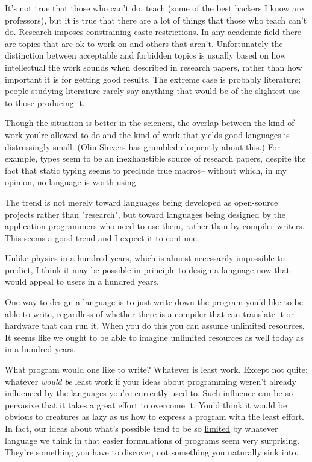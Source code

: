 It's not true that those who can't do, teach (some of the best
hackers I know are professors), but it is true that there are a
lot of things that those who teach can't do.  \href{http://www.paulgraham.com/desres.html}{Research} imposes
constraining caste restrictions.  In any academic
field there are topics that are ok to work on and others that
aren't.  Unfortunately the distinction between acceptable and
forbidden topics is usually based on how intellectual
the work sounds when described in research papers, rather than
how important it is for getting good results.  The extreme case
is probably literature; people studying literature rarely  
say anything that would be of the slightest use to those
producing it.

Though the situation is better in the sciences,
the overlap between the kind of work you're allowed to do and the
kind of work that yields good languages is distressingly small.
(Olin Shivers has grumbled eloquently
about this.)  For example, types seem to be an inexhaustible source
of research papers, despite the fact that static typing
seems to preclude true macros-- without which, in my opinion, no
language is worth using.

The trend is not merely toward languages being developed
as open-source projects rather than "research", but toward
languages being designed by the application programmers who need
to use them, rather than by compiler writers.  This seems a good
trend and I expect it to continue.




Unlike physics in a hundred years, which is almost necessarily
impossible to predict, I think it may be possible in principle
to design a language now that would appeal to users in a hundred
years.

One way to design a language is to just write down the program
you'd like to be able to write, regardless of whether there 
is a compiler that can translate it or hardware that can run it.
When you do this you can assume unlimited resources.  It seems
like we ought to be able to imagine unlimited resources as well
today as in a hundred years.

What program would one like to write?  Whatever is least work.
Except not quite: whatever \emph{would be} least work if your ideas about
programming weren't already influenced by the languages you're 
currently used to.  Such influence can be so pervasive that   
it takes a great effort to overcome it.  You'd think it would
be obvious to creatures as lazy as us how to express a program
with the least effort.  In fact, our ideas about what's possible
tend to be so \href{http://www.paulgraham.com/avg.html}{limited} by whatever language we think in  that
easier formulations of programs seem very surprising.  They're
something you have to discover, not something you naturally
sink into.

